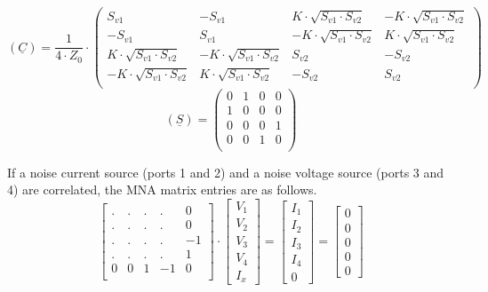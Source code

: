 \begin{equation}
(\underline{C}) = \frac{1}{4\cdot Z_0}\cdot
\begin{pmatrix}
 S_{v1} & -S_{v1} &  K\cdot\sqrt{S_{v1}\cdot S_{v2}} & -K\cdot\sqrt{S_{v1}\cdot S_{v2}} \\
-S_{v1} &  S_{v1} & -K\cdot\sqrt{S_{v1}\cdot S_{v2}} &  K\cdot\sqrt{S_{v1}\cdot S_{v2}} \\
 K\cdot\sqrt{S_{v1}\cdot S_{v2}} & -K\cdot\sqrt{S_{v1}\cdot S_{v2}} &  S_{v2} & -S_{v2} \\
-K\cdot\sqrt{S_{v1}\cdot S_{v2}} &  K\cdot\sqrt{S_{v1}\cdot S_{v2}} & -S_{v2} &  S_{v2} \\
\end{pmatrix}
\end{equation}
\begin{equation}
(\underline{S}) =
\begin{pmatrix}
 0 & 1 & 0 & 0 \\
 1 & 0 & 0 & 0 \\
 0 & 0 & 0 & 1 \\
 0 & 0 & 1 & 0 \\
\end{pmatrix}
\end{equation}


If a noise current source (ports 1 and 2) and a noise voltage
source (ports 3 and 4) are correlated, the MNA matrix entries
are as follows.
\begin{equation}
\begin{bmatrix}
.&.&.&.&  0 \\
.&.&.&.&  0 \\
.&.&.&.& -1 \\
.&.&.&.&  1 \\
0 &  0 & 1 & -1 & 0 \\
\end{bmatrix}
\cdot
\begin{bmatrix}
V_{1}\\
V_{2}\\
V_{3}\\
V_{4}\\
I_x
\end{bmatrix}
=
\begin{bmatrix}
I_{1}\\
I_{2}\\
I_{3}\\
I_{4}\\
0
\end{bmatrix}
=
\begin{bmatrix}
0\\
0\\
0\\
0\\
0
\end{bmatrix}
\end{equation}

